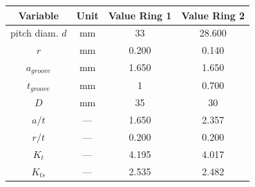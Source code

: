 \begin{tabular}{|c|c|c|c|}
\hline
Variable & Unit & Value Ring 1 & Value Ring 2 \\ \hline

pitch diam. $d$ & mm & 33 & 28.600 \\ \hline
$r$ & mm & 0.200 & 0.140 \\ \hline
$a_{groove}$ & mm & 1.650 & 1.650 \\ \hline
$t_{groove}$ & mm & 1 & 0.700 \\ \hline
$D$ & mm & 35 & 30 \\ \hline
$a/t$ & --- & 1.650 & 2.357 \\ \hline
$r/t$ & --- & 0.200 & 0.200 \\ \hline
$K_t$ & --- & 4.195 & 4.017 \\ \hline
$K_{ts}$ & --- & 2.535 & 2.482 \\ \hline

\end{tabular}
